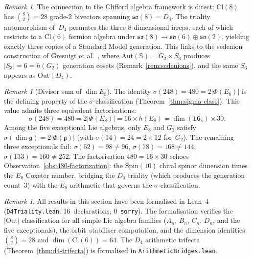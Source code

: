 \documentclass[11pt]{amsart}
\theoremstyle{plain}
\theoremstyle{definition}
\theoremstyle{remark}
\newtheorem{remark}[theorem]{Remark}
\newcommand{\fg}{\mathfrak{g}}
\renewcommand{\Phi}{\varPhi}
\begin{document}
\begin{remark}\label{rem:cl8-d4}
The connection to the Clifford algebra framework is direct:
$\mathrm{Cl}(8)$ has $\binom{8}{2} = 28$ grade-$2$ bivectors spanning
$\mathfrak{so}(8) = D_4$.  The triality automorphism of~$D_4$ permutes
the three $8$-dimensional irreps, each of which restricts to a
$\mathrm{Cl}(6)$ fermion algebra under
$\mathfrak{so}(8) \to \mathfrak{so}(6) \oplus \mathfrak{so}(2)$,
yielding exactly three copies of a Standard Model generation.
This links to the sedenion construction of
Gresnigt et al.~\cite{Gresnigt2023}, where
$\mathrm{Aut}(\mathbb{S}) = G_2 \times S_3$ produces
$|S_3| = 6 = h(G_2)$ generation cosets (Remark~\ref{rem:sedenions}),
and the same $S_3$ appears as $\mathrm{Out}(D_4)$.
\end{remark}

\begin{remark}[Divisor sum of $\dim E_8$]\label{rem:sigma-248}
The identity $\sigma(248) = 480 = 2|\Phi(E_8)|$ is the defining
property of the $\sigma$-classification
(Theorem~\ref{thm:sigma-class}).
This value admits three equivalent factorisations:
\[
  \sigma(248) = 480 = 2|\Phi(E_8)| = 16 \times h(E_8)
  = \dim(\mathbf{16}_s) \times 30.
\]
Among the five exceptional Lie algebras, only $E_8$ and $G_2$ satisfy
$\sigma(\dim\fg) = 2|\Phi(\fg)|$ (with $\sigma(14) = 24 = 2 \times 12$
for~$G_2$).  The remaining three exceptionals fail:
$\sigma(52) = 98 \ne 96$, $\sigma(78) = 168 \ne 144$,
$\sigma(133) = 160 \ne 252$.
The factorisation $480 = 16 \times 30$ echoes
Observation~\ref{obs:480-factorization}: the $\mathrm{Spin}(10)$
chiral spinor dimension times the $E_8$ Coxeter number, bridging the
$D_4$ triality (which produces the generation count~$3$) with the
$E_8$ arithmetic that governs the $\sigma$-classification.
\end{remark}

\begin{remark}\label{rem:lean-d4}
All results in this section have been formalised in Lean~4
(\texttt{D4Triality.lean}: 16~declarations, 0~\texttt{sorry}).
The formalisation verifies the $|\mathrm{Out}|$ classification for all
simple Lie algebra families ($A_n$, $B_n$, $C_n$, $D_n$, and the five
exceptionals), the orbit--stabiliser computation, and the dimension
identities $\binom{8}{2} = 28$ and $\dim(\mathrm{Cl}(6)) = 64$.
The $D_4$ arithmetic trifecta (Theorem~\ref{thm:d4-trifecta}) is
formalised in \texttt{ArithmeticBridges.lean}.
\end{remark}
\end{document}
